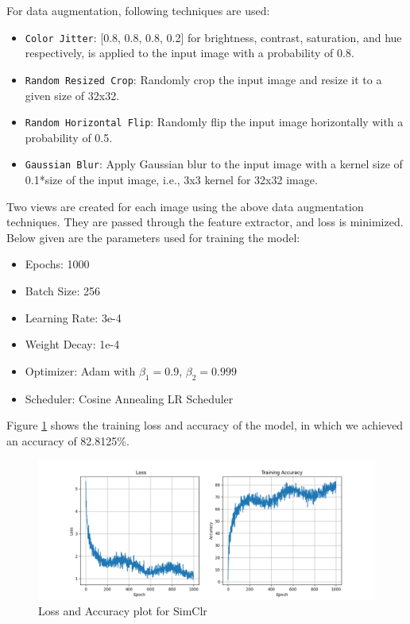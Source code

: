 For data augmentation, following techniques are used:
\begin{itemize}
    \item \texttt{Color Jitter}: [0.8, 0.8, 0.8, 0.2] for brightness, contrast, saturation, and hue respectively, is applied to the input image with a probability of 0.8.
    \item \texttt{Random Resized Crop}: Randomly crop the input image and resize it to a given size of 32x32.
    \item \texttt{Random Horizontal Flip}: Randomly flip the input image horizontally with a probability of 0.5.
    \item \texttt{Gaussian Blur}: Apply Gaussian blur to the input image with a kernel size of 0.1*size of the input image, i.e., 3x3 kernel for 32x32 image.
\end{itemize}
Two views are created for each image using the above data augmentation techniques. They are passed through the feature extractor, and loss is minimized.
Below given are the parameters used for training the model:
\begin{itemize}
    \item Epochs: 1000
    \item Batch Size: 256
    \item Learning Rate: 3e-4
    \item Weight Decay: 1e-4
    \item Optimizer: Adam with $\beta_1=0.9$, $\beta_2=0.999$
    \item Scheduler: Cosine Annealing LR Scheduler  
\end{itemize}
Figure \ref{fig:loss_accuracy} shows the training loss and accuracy of the model, in which we achieved an accuracy of 82.8125\%.
\begin{figure}[h]
    \centering
    \includegraphics[width=1.0\linewidth]{images/loss_accuracy.png}
    \caption{Loss and Accuracy plot for SimClr}
    \label{fig:loss_accuracy}
\end{figure}

